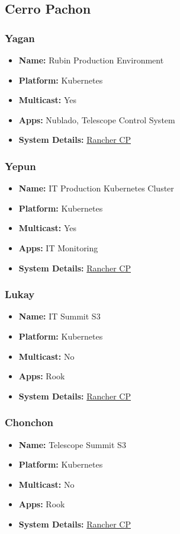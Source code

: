 \newpage
\subsection{Cerro Pachon}
\subsubsection{Yagan}
\begin{itemize}
  \itemsep0em 
  \item \textbf{Name:}       Rubin Production Environment
  \item \textbf{Platform:}   Kubernetes
  \item \textbf{Multicast:}  Yes
  \item \textbf{Apps:}       Nublado, Telescope Control System
  \item \textbf{System Details:} \href{https://rancher.cp.lsst.org}{Rancher CP}
\end{itemize}

\subsubsection{Yepun}
\begin{itemize}
  \itemsep0em 
  \item \textbf{Name:}       IT Production Kubernetes Cluster
  \item \textbf{Platform:}   Kubernetes
  \item \textbf{Multicast:}  Yes
  \item \textbf{Apps:}       IT Monitoring
  \item \textbf{System Details:} \href{https://rancher.cp.lsst.org}{Rancher CP}
\end{itemize}

\subsubsection{Lukay}
\begin{itemize}
  \itemsep0em 
  \item \textbf{Name:}       IT Summit S3
  \item \textbf{Platform:}   Kubernetes
  \item \textbf{Multicast:}  No
  \item \textbf{Apps:}       Rook
  \item \textbf{System Details:} \href{https://rancher.cp.lsst.org}{Rancher CP}
\end{itemize}

\subsubsection{Chonchon}
\begin{itemize}
  \itemsep0em 
  \item \textbf{Name:}       Telescope Summit S3
  \item \textbf{Platform:}   Kubernetes
  \item \textbf{Multicast:}  No
  \item \textbf{Apps:}       Rook
  \item \textbf{System Details:} \href{https://rancher.cp.lsst.org}{Rancher CP}
\end{itemize}

